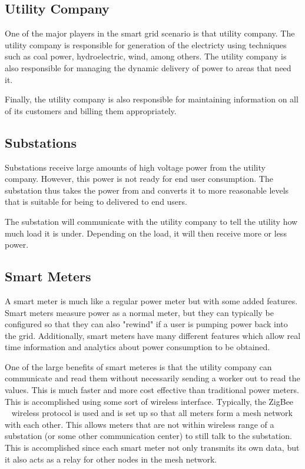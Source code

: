 \subsection{Utility Company}
One of the major players in the smart grid scenario is that utility company. The utility company is responsible for
generation of the electricty using techniques such as coal power, hydroelectric, wind, among others. The utility
company is also responsible for managing the dynamic delivery of power to areas that need it.

Finally, the utility company is also responsible for maintaining information on all of its customers and billing them
appropriately.

\subsection{Substations}
Substations receive large amounts of high voltage power from the utility company. However, this power is not ready
for end user consumption. The substation thus takes the power from and converts it to  more reasonable levels
that is suitable for being to delivered to end users.

The substation will communicate with the utility company to tell the utility how much load it is under. Depending on
the load, it will then receive more or less power.

\subsection{Smart Meters}
A smart meter is much like a regular power meter but with some added features. Smart meters measure power as
a normal meter, but they can typically be configured so that they can also "rewind" if a user is pumping power back
into the grid. Additionally, smart meters have many different features which allow real time information and analytics
about power consumption to be obtained.

One of the large benefits of smart meteres is that the utility company can communicate and read them without
necessarily sending a worker out to read the values. This is much faster and more cost effective than traditional
power meters. This is accomplished using some sort of wireless interface. Typically, the ZigBee~\cite{zigbee}
~\cite{aminetworking}
wireless protocol is used and is set up so that all meters form a mesh network with each other. This allows meters
that are not within wireless range of a substation (or some other communication center) to still talk to the substation.
This is accomplished since each smart meter not only transmits its own data, but it also acts as a relay for other nodes
in the mesh network.

